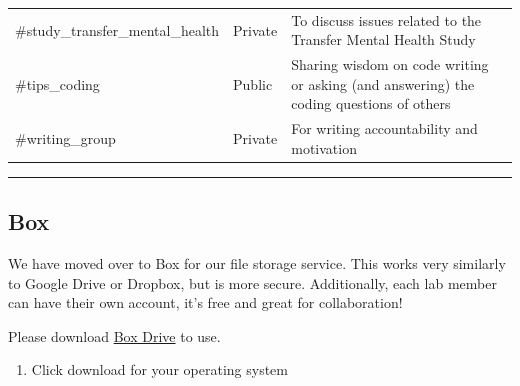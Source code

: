 \documentclass[]{book}
\providecommand{\tightlist}{%
  \setlength{\itemsep}{0pt}\setlength{\parskip}{0pt}}
\begin{document}
\begin{longtable}[]{@{}lll@{}}
\begin{minipage}[t]{0.18\columnwidth}
\#study\_transfer\_mental\_health\strut
\end{minipage} & \begin{minipage}[t]{0.05\columnwidth}\raggedright\strut
Private\strut
\end{minipage} & \begin{minipage}[t]{0.69\columnwidth}\raggedright\strut
To discuss issues related to the Transfer Mental Health Study\strut
\end{minipage}\tabularnewline
\begin{minipage}[t]{0.18\columnwidth}\raggedright\strut
\#tips\_coding\strut
\end{minipage} & \begin{minipage}[t]{0.05\columnwidth}\raggedright\strut
Public\strut
\end{minipage} & \begin{minipage}[t]{0.69\columnwidth}\raggedright\strut
Sharing wisdom on code writing or asking (and answering) the coding
questions of others\strut
\end{minipage}\tabularnewline
\begin{minipage}[t]{0.18\columnwidth}\raggedright\strut
\#writing\_group\strut
\end{minipage} & \begin{minipage}[t]{0.05\columnwidth}\raggedright\strut
Private\strut
\end{minipage} & \begin{minipage}[t]{0.69\columnwidth}\raggedright\strut
For writing accountability and motivation\strut
\end{minipage}\tabularnewline
\bottomrule
\end{longtable}

\begin{center}\rule{0.5\linewidth}{0.5pt}\end{center}

\subsection{Box}\label{box}

We have moved over to Box for our file storage service. This works very
similarly to Google Drive or Dropbox, but is more secure. Additionally,
each lab member can have their own account, it's free and great for
collaboration!

Please download \href{https://www.box.com/drive}{Box Drive} to use.

\begin{enumerate}
\def\labelenumi{\arabic{enumi}.}
\tightlist
\item
  Click download for your operating system
\end{enumerate}
\end{document}
